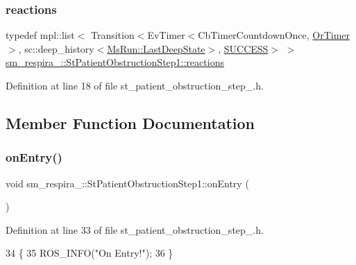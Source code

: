 \subsubsection{\texorpdfstring{reactions}{reactions}}
{\footnotesize\ttfamily typedef mpl\+::list$<$ Transition$<$Ev\+Timer$<$Cb\+Timer\+Countdown\+Once, \hyperlink{classsm__respira__1_1_1OrTimer}{Or\+Timer}$>$, sc\+::deep\+\_\+history$<$\hyperlink{classsmacc_1_1SmaccState_a60088405d2d99d468caa0baa3b2830a8}{Ms\+Run\+::\+Last\+Deep\+State}$>$, \hyperlink{classSUCCESS}{S\+U\+C\+C\+E\+SS}$>$ $>$ \hyperlink{structsm__respira__1_1_1StPatientObstructionStep1_ab9ffaa25ba44c387753d3104039d0ee6}{sm\+\_\+respira\+\_\+::\+St\+Patient\+Obstruction\+Step1\+::reactions}}



Definition at line 18 of file st\+\_\+patient\+\_\+obstruction\+\_\+step\+\_.\+h.



\subsection{Member Function Documentation}
\mbox{\label{structsm__respira__1_1_1StPatientObstructionStep1_abf880550f32fc9a0013f72862b08b585}} 
\subsubsection{\texorpdfstring{on\+Entry()}{onEntry()}}
{\footnotesize\ttfamily void sm\+\_\+respira\+\_\+::\+St\+Patient\+Obstruction\+Step1\+::on\+Entry (\begin{DoxyParamCaption}{ }\end{DoxyParamCaption})\hspace{0.3cm}{\ttfamily [inline]}}



Definition at line 33 of file st\+\_\+patient\+\_\+obstruction\+\_\+step\+\_.\+h.


\begin{DoxyCode}
34     \{
35         ROS\_INFO(\textcolor{stringliteral}{"On Entry!"});
36     \}
\end{DoxyCode}
\mbox{\label{structsm__respira__1_1_1StPatientObstructionStep1_a9db651db42809f269204c64762f3bad8}} 
